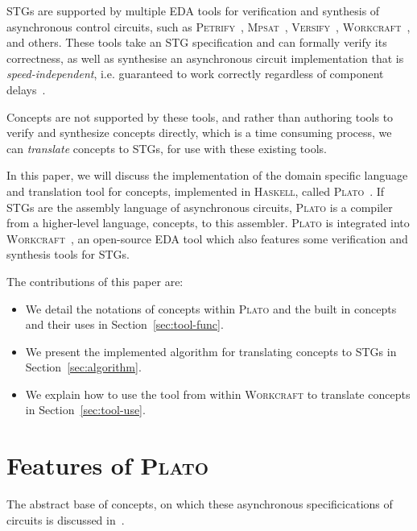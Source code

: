 \documentclass[british,conference,compsoc]{IEEEtran}
\newcommand{\noun}[1]{\textsc{#1}}
\begin{document}
STGs are supported by multiple EDA tools for verification and synthesis of asynchronous control circuits,
such as \noun{Petrify}~\cite{Cortadella}, \noun{Mpsat}~\cite{khomenko2004detecting}, 
\noun{Versify}~\cite{i1997formal}, 
\noun{Workcraft}~\cite{2007_poliakov_workcraft}\cite{Workcraft_website}, 
and others. These tools take an STG specification and can formally verify its correctness, 
as well as synthesise an asynchronous circuit implementation that is 
\emph{speed-independent}, i.e. guaranteed to work correctly regardless of 
component delays~\cite{Muller_1959_ts}.

Concepts are not supported by these tools, and rather than
authoring tools to verify and synthesize concepts directly, which is a time 
consuming process, we can \emph{translate} concepts to STGs, for use with these
existing tools.

In this paper, we will discuss the implementation of the domain specific 
language and translation tool for concepts, implemented in \noun{Haskell}, called 
\noun{Plato}~\cite{2016_concepts_github}.
If STGs are the assembly language of asynchronous circuits, \noun{Plato} is a 
compiler from a higher-level language, concepts, to this assembler. \noun{Plato} is 
integrated into \noun{Workcraft}~\cite{Workcraft_website}, an open-source 
EDA tool which also features some verification and synthesis tools for STGs.

The contributions of this paper are:
\vspace{-1mm}
\begin{itemize}
  \item We detail the notations of concepts within \noun{Plato} and the built in
  concepts and their uses in Section~\ref{sec:tool-func}.
  \item We present the implemented algorithm for translating concepts to STGs
  in Section~\ref{sec:algorithm}.
  \item We explain how to use the tool from within
  \noun{Workcraft} to translate concepts in Section~\ref{sec:tool-use}.
\end{itemize}

\section{Features of \noun{Plato}\label{sec:tool-func}}

\vspace{-3mm}

The abstract base of concepts, on which these asynchronous specificications of 
circuits is discussed in~\cite{2015_Beaumont_MEMOCODE}.
\end{document}
